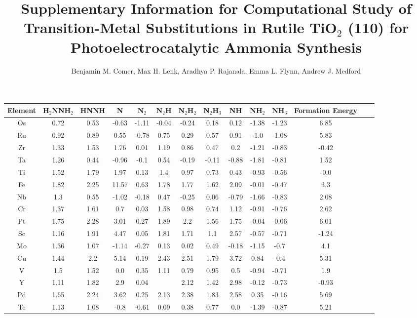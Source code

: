 \documentclass{article}
\title{\TitleFont Supplementary Information for Computational Study of Transition-Metal Substitutions in Rutile TiO$_2$ (110) for Photoelectrocatalytic Ammonia Synthesis}
\author{Benjamin M. Comer, Max H. Lenk, Aradhya P. Rajanala, Emma L. Flynn, Andrew J. Medford}
\begin{document}
\maketitle\begin{table}
\setlength\tabcolsep{2pt}
\begin{center}
\begin{tabular}{| c | c | c | c | c | c | c | c | c | c | c | c | c | c |}
\hline
Element & H$_2$NNH$_2$ & HNNH & N & N$_2$ & N$_2$H & N$_2$H$_2$ & N$_2$H$_3$ & NH & NH$_2$ & NH$_3$ & Formation Energy\\
\hline

Os & 0.72 & 0.53 & -0.63 & -1.11 & -0.04 & -0.24 & 0.18 & 0.12 & -1.38 & -1.23 & 6.85 \\
Ru & 0.92 & 0.89 & 0.55 & -0.78 & 0.75 & 0.29 & 0.57 & 0.91 & -1.0 & -1.08 & 5.83 \\
Zr & 1.33 & 1.53 & 1.76 & 0.01 & 1.19 & 0.86 & 0.47 & 0.2 & -1.21 & -0.83 & -0.42 \\
Ta & 1.26 & 0.44 & -0.96 & -0.1 & 0.54 & -0.19 & -0.11 & -0.88 & -1.81 & -0.81 & 1.52 \\
Ti & 1.52 & 1.79 & 1.97 & 0.13 & 1.4 & 0.97 & 0.73 & 0.43 & -0.93 & -0.56 & -0.0 \\
Fe & 1.82 & 2.25 & 11.57 & 0.63 & 1.78 & 1.77 & 1.62 & 2.09 & -0.01 & -0.47 & 3.3 \\
Nb & 1.3 & 0.55 & -1.02 & -0.18 & 0.47 & -0.25 & 0.06 & -0.79 & -1.66 & -0.83 & 2.08 \\
Cr & 1.37 & 1.61 & 0.7 & 0.03 & 1.58 & 0.98 & 0.74 & 1.12 & -0.91 & -0.76 & 2.62 \\
Pt & 1.75 & 2.28 & 3.01 & 0.27 & 1.89 & 2.2 & 1.56 & 1.75 & -0.04 & -0.06 & 6.01 \\
Sc & 1.16 & 1.91 & 4.47 & 0.05 & 1.81 & 1.71 & 1.1 & 2.57 & -0.57 & -0.71 & -1.24 \\
Mo & 1.36 & 1.07 & -1.14 & -0.27 & 0.13 & 0.02 & 0.49 & -0.18 & -1.15 & -0.7 & 4.1 \\
Cu & 1.44 & 2.2 & 5.14 & 0.19 & 2.43 & 2.51 & 1.79 & 3.72 & 0.84 & -0.4 & 5.31 \\
V & 1.5 & 1.52 & 0.0 & 0.35 & 1.11 & 0.79 & 0.95 & 0.5 & -0.94 & -0.71 & 1.9 \\
Y & 1.11 & 1.82 & 2.9 & 0.04 &  & 2.12 & 1.42 & 2.98 & -0.12 & -0.73 & -0.93 \\
Pd & 1.65 & 2.24 & 3.62 & 0.25 & 2.13 & 2.38 & 1.83 & 2.58 & 0.35 & -0.16 & 5.69 \\
Tc & 1.13 & 1.08 & -0.8 & -0.61 & 0.09 & 0.38 & 0.77 & 0.0 & -1.39 & -0.87 & 5.21 \\

\end{tabular}
\end{center}
\end{table}
\end{document}
